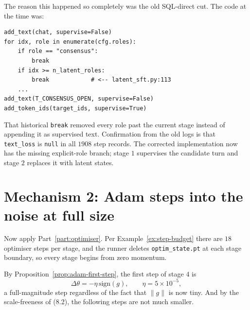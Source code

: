 \documentclass[11pt]{article}
\theoremstyle{definition}
\begin{document}
\begin{center}
\end{center}

The reason this happened so completely was the old SQL-direct cut. The code at the time was:

\begin{lstlisting}
add_text(chat, supervise=False)
for idx, role in enumerate(cfg.roles):
    if role == "consensus":
        break
    if idx >= n_latent_roles:
        break            # <-- latent_sft.py:113
    ...
add_text(T_CONSENSUS_OPEN, supervise=False)
add_token_ids(target_ids, supervise=True)
\end{lstlisting}

That historical \texttt{break} removed every role past the current stage instead of appending it as supervised text. Confirmation from the old logs is that \texttt{text\_loss} is \texttt{null} in all $1908$ step records. The corrected implementation now has the missing explicit-role branch; stage $1$ supervises the candidate turn and stage $2$ replaces it with latent states.

\begin{center}
\end{center}

\section{Mechanism 2: Adam steps into the noise at full size}

Now apply Part~\ref{part:optimiser}. Per Example~\ref{ex:step-budget} there are $18$ optimiser steps per stage, and the runner deletes \texttt{optim\_state.pt} at each stage boundary, so every stage begins from zero momentum.

By Proposition~\ref{prop:adam-first-step}, the first step of stage $4$ is
\[
\Delta\theta = -\eta\,\mathrm{sign}(g),\qquad \eta = 5\times10^{-5},
\]
a full-magnitude step regardless of the fact that $\|g\|$ is now tiny. And by the scale-freeness of (8.2), the following steps are not much smaller.
\end{document}
